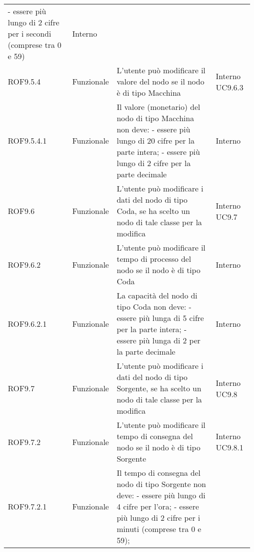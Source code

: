 \begin{longtable}{p{2cm}!{\VRule[1pt]}p{2cm}!{\VRule[1pt]}p{5cm}!{\VRule[1pt]}p{1.5cm}}
	- essere più lungo di 2 cifre per i secondi (comprese tra 0 e 59) & Interno \\
	ROF9.5.4                         & Funzionale\newline               & L'utente può modificare il valore del nodo se il nodo è di tipo Macchina                                                & Interno \newline UC9.6.3     
	\\
	ROF9.5.4.1&Funzionale\newline  & Il valore (monetario) del nodo di tipo Macchina non deve:
	- essere più lungo di 20 cifre per la parte intera;
	- essere  più lungo di 2 cifre per la parte decimale & Interno \\
	ROF9.6                           & Funzionale\newline               & L'utente può modificare i dati del nodo di tipo Coda, se ha scelto un nodo di tale classe per la modifica                & Interno \newline UC9.7       
	\\
	ROF9.6.2                         & Funzionale\newline               & L'utente può modificare il tempo di processo del nodo se il nodo è di tipo Coda                                         & Interno                      \\
	ROF9.6.2.1&Funzionale\newline  & La capacità del nodo di tipo Coda non deve:
	- essere più lunga di 5 cifre per la parte intera;
	- essere più lunga di 2 per la parte decimale & Interno \\
	ROF9.7                           & Funzionale\newline               & L'utente può modificare i dati del nodo di tipo Sorgente, se ha scelto un nodo di tale classe per la modifica            & Interno \newline UC9.8       
	\\
	ROF9.7.2                         & Funzionale\newline               & L'utente può modificare il tempo di consegna del nodo se il nodo è di tipo Sorgente                                     & Interno \newline UC9.8.1     
	\\
	ROF9.7.2.1&Funzionale\newline  & Il tempo di consegna del nodo di tipo Sorgente non deve:
	- essere più lungo di 4 cifre per l'ora;
	- essere più lungo di 2 cifre per i minuti (comprese tra 0 e 59);

\end{longtable}
